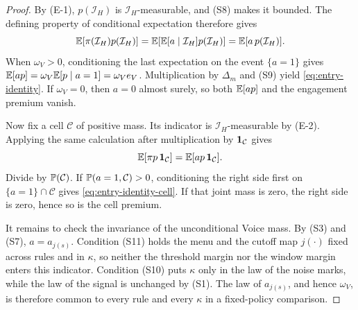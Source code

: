 \begin{proof}
By (E-1), $p(\mathcal I_H)$ is $\mathcal I_H$-measurable, and (S8) makes it bounded. The defining
property of conditional expectation therefore gives
\[
  \mathbb{E}[\pi(\mathcal I_H)p(\mathcal I_H)]
  =\mathbb{E}\!\left[\mathbb{E}[a\mid\mathcal I_H]p(\mathcal I_H)\right]
  =\mathbb{E}[a\,p(\mathcal I_H)].
\]
When $\omega_V>0$, conditioning the last expectation on the event $\{a=1\}$ gives
$\mathbb{E}[a p]=\omega_V\mathbb{E}[p\mid a=1]=\omega_Ve_V$. Multiplication by $\Delta_m$ and (S9) yield
\eqref{eq:entry-identity}. If $\omega_V=0$, then $a=0$ almost surely, so both
$\mathbb{E}[a p]$ and the engagement premium vanish.

Now fix a cell $\mathcal C$ of positive mass. Its indicator is $\mathcal I_H$-measurable by
(E-2). Applying the same calculation after multiplication by $\mathbf{1}_{\mathcal C}$ gives
\[
  \mathbb{E}[\pi p\,\mathbf{1}_{\mathcal C}]
  =\mathbb{E}[a p\,\mathbf{1}_{\mathcal C}].
\]
Divide by $\mathbb{P}(\mathcal C)$. If $\mathbb{P}(a=1,\mathcal C)>0$, conditioning the right side first on
$\{a=1\}\cap\mathcal C$ gives \eqref{eq:entry-identity-cell}. If that joint mass is zero, the
right side is zero, hence so is the cell premium.

It remains to check the invariance of the unconditional Voice mass. By (S3) and (S7),
$a=a_{j(s)}$. Condition (S11) holds the menu and the cutoff map $j(\cdot)$ fixed across rules and
in $\kappa$, so neither the threshold margin nor the window margin enters this indicator.
Condition (S10) puts $\kappa$ only in the law of the noise marks, while the law of the signal is
unchanged by (S1). The law of $a_{j(s)}$, and hence $\omega_V$, is therefore common to every rule
and every $\kappa$ in a fixed-policy comparison.
\end{proof}

